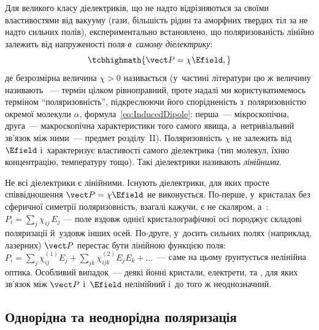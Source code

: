 Для великого класу діелектриків, що не надто відрізняються за своїми властивостями від
вакууму (гази, більшість рідин та аморфних твердих тіл за не надто сильних полів),
експериментально встановлено, що поляризованість лінійно залежить від напруженості поля
\emph{в~самому діелектрику}:
\begin{equation}\label{eq:PlinearE}
	\tcbhighmath{
		\vect P = \chi \Efield,
	}
\end{equation}
де безрозмірна величина $\chi > 0$ називається  (у~частині
літератури цю ж величину називають ~--- термін цілком
рівноправний, проте надалі ми користуватимемось терміном \enquote{поляризовність},
підкреслюючи його спорідненість з~поляризовністю окремої молекули $\alpha$,
формула~\eqref{eq:InducedDipole}: перша~--- мікроскопічна, друга~--- макроскопічна
характеристики того самого явища, а~нетривіальний зв'язок між ними~--- предмет
розділу~II). Поляризовність $\chi$ не залежить від $\Efield$ і~характеризує властивості
самого діелектрика (тип молекул, їхню концентрацію, температуру тощо). Такі діелектрики
називають \emph{лінійними}.

\begin{Attention}
	Не всі діелектрики є лінійними. Існують діелектрики, для яких просте співвідношення
	$\vect P = \chi\Efield$ не виконується. По-перше, у~кристалах без сферичної симетрії
	поляризовність, взагалі кажучи, є не скаляром, а~: $P_i = \sum_j
		\chi_{ij}\,E_j$ --- поле вздовж однієї кристалографічної осі породжує складові
	поляризації й~уздовж інших осей. По-друге, у~досить сильних полях (наприклад,
	лазерних) $\vect P$ перестає бути лінійною функцією поля: $P_i = \sum_j
		\chi^{(1)}_{ij}E_j + \sum_{jk}\chi^{(2)}_{ijk}E_jE_k + \ldots$~--- саме на цьому
	ґрунтується нелінійна оптика. Особливий випадок~--- деякі йонні кристали, електрети,
	та , для яких зв'язок між $\vect P$ і~$\Efield$ нелінійний
	і~до того ж неоднозначний.
\end{Attention}


\subsection*{Однорідна та неоднорідна поляризація}


